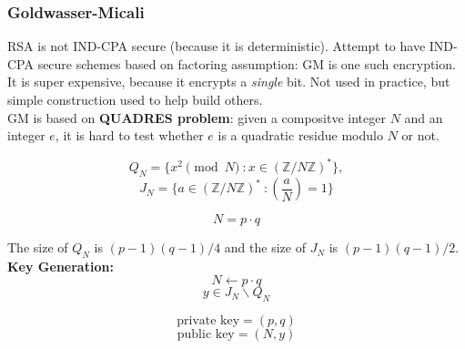 \subsubsection{Goldwasser-Micali}
RSA is not IND-CPA secure (because it is deterministic). Attempt to have IND-CPA secure schemes based on factoring assumption:
GM is one such encryption. It is super expensive, because it encrypts a \emph{single} bit.
Not used in practice, but simple construction used to help build others. \\

GM is based on \textbf{QUADRES problem}: given a compositve integer $N$ and an integer $e$,
it is hard to test whether $e$ is a quadratic residue modulo $N$ or not.

\[ Q_N = \{x^2 \pmod{N} \ : x \in (\mathbb{Z}/N\mathbb{Z})^* \}, \]
\[ J_N = \{ a \in (\mathbb{Z}/N\mathbb{Z})^* \ : \left(\frac{a}{N}\right)=1\}\]

\[ N = p \cdot q\]

The size of $Q_N$ is $(p-1)(q-1)/4$ and the size of $J_N$ is $(p-1)(q-1)/2$. \\

\textbf{Key Generation:}
\[ N \leftarrow p \cdot q \]
\[ y \in J_N \backslash Q_N \]

\[ \text{private key} = (p,q) \]
\[ \text{public key} = (N,y) \]

